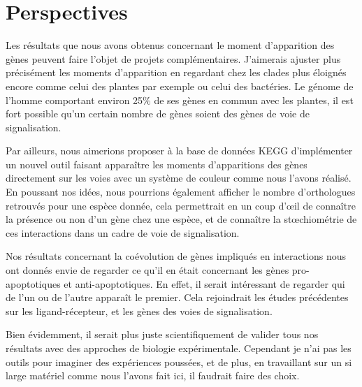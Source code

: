 \section{Perspectives}
\par Les résultats que nous avons obtenus concernant le moment d’apparition des gènes peuvent faire l’objet de projets complémentaires. J’aimerais ajuster plus précisément les moments d’apparition en regardant chez les clades plus éloignés encore comme celui des plantes par exemple ou celui des bactéries. Le génome de l’homme comportant environ 25\% de ses gènes en commun avec les plantes, il est fort possible qu’un certain nombre de gènes soient des gènes de voie de signalisation.
\par Par ailleurs, nous aimerions proposer à la base de données KEGG d’implémenter un nouvel outil faisant apparaître les moments d’apparitions des gènes directement sur les voies avec un système de couleur comme nous l’avons réalisé. En poussant nos idées, nous pourrions également afficher le nombre d’orthologues retrouvés pour une espèce donnée, cela permettrait en un coup d’œil de connaître la présence ou non d’un gène chez une espèce, et de connaître la stœchiométrie de ces interactions dans un cadre de voie de signalisation. 
\par Nos résultats concernant la coévolution de gènes impliqués en interactions nous ont donnés envie de regarder ce qu’il en était concernant les gènes pro-apoptotiques et anti-apoptotiques. En effet, il serait intéressant de regarder qui de l’un ou de l’autre apparaît le premier. Cela rejoindrait les études précédentes sur les ligand-récepteur, et les gènes des voies de signalisation. 
\par Bien évidemment, il serait plus juste scientifiquement de valider tous nos résultats avec des approches de biologie expérimentale. Cependant je n’ai pas les outils pour imaginer des expériences poussées, et de plus, en travaillant sur un si large matériel comme nous l’avons fait ici, il faudrait faire des choix. 
